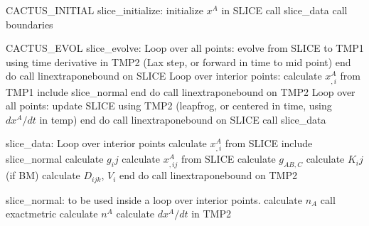 {\obeylines

CACTUS\_INITIAL slice\_initialize: 
\quad	initialize $x^A$ in SLICE
\quad	call slice\_data
\quad	call boundaries

CACTUS\_EVOL slice\_evolve: 
\quad	Loop over all points:
\quad\quad		evolve from SLICE to TMP1 using time derivative in TMP2
\quad\quad\quad			(Lax step, or forward in time to mid point)
\quad	end do	
\quad	call linextraponebound on SLICE
\quad	Loop over interior points:
\quad\quad		calculate $x^A_{,i}$ from TMP1	
\quad\quad		include slice\_normal
\quad	end do	
\quad	call linextraponebound on TMP2
\quad	Loop over all points:
\quad\quad		update SLICE using TMP2
\quad\quad\quad			(leapfrog, or centered in time, using $dx^A/dt$ in temp)
\quad	end do
\quad	call linextraponebound on SLICE
\quad	call slice\_data	

slice\_data:
\quad	Loop over interior points
\quad\quad		calculate $x^A_{,i}$ from SLICE
\quad\quad		include slice\_normal
\quad\quad		calculate $g_ij$
\quad\quad		calculate $x^A_{,ij}$ from SLICE
\quad\quad		calculate $g_{AB,C}$
\quad\quad		calculate $K_ij$
\quad\quad		(if BM) calculate $D_{ijk}$, $V_i$
\quad	end do	
\quad	call linextraponebound on TMP2
			
slice\_normal: to be used inside a loop over interior points.
\quad		calculate $n_A$
\quad		call exactmetric
\quad		calculate $n^A$
\quad		calculate $dx^A/dt$ in TMP2

}
						





